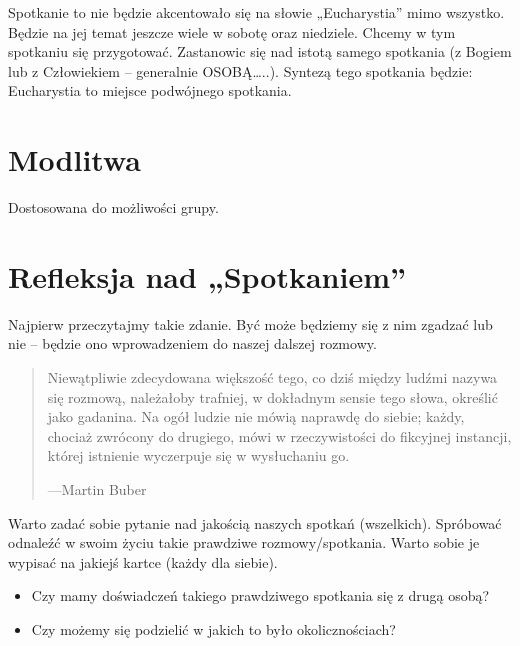 \documentclass[a5paper,10pt,polish]{book}
\begin{document}
Spotkanie to nie będzie akcentowało się na słowie „Eucharystia” mimo wszystko. Będzie na jej temat jeszcze wiele w sobotę oraz niedziele. Chcemy w tym spotkaniu się przygotować. Zastanowic się nad istotą samego spotkania (z Bogiem lub z Człowiekiem – generalnie OSOBĄ…..). Syntezą tego spotkania będzie: Eucharystia to miejsce podwójnego spotkania.


\section{Modlitwa}
\label{babice2006-jesien-knurow/spotkanie1:modlitwa}
Dostosowana do możliwości grupy.


\section{Refleksja nad „Spotkaniem”}
\label{babice2006-jesien-knurow/spotkanie1:refleksja-nad-spotkaniem}
Najpierw przeczytajmy takie zdanie. Być może będziemy się z nim zgadzać lub nie – będzie ono wprowadzeniem do naszej dalszej rozmowy.
\begin{quote}

Niewątpliwie zdecydowana większość tego, co dziś między ludźmi nazywa się rozmową, należałoby trafniej, w dokładnym sensie tego słowa, określić jako gadanina. Na ogół ludzie nie mówią naprawdę do siebie; każdy, chociaż zwrócony do drugiego, mówi w rzeczywistości do fikcyjnej instancji, której istnienie wyczerpuje się w wysłuchaniu go.

\begin{flushright}
---Martin Buber
\end{flushright}
\end{quote}

Warto zadać sobie pytanie nad jakością naszych spotkań (wszelkich). Spróbować odnaleźć w swoim życiu takie prawdziwe rozmowy/spotkania. Warto sobie je wypisać na jakiejś kartce (każdy dla siebie).
\begin{itemize}
\item {} 
Czy mamy doświadczeń takiego prawdziwego spotkania się z drugą osobą?

\item {} 
Czy możemy się podzielić w jakich to było okolicznościach?

\end{itemize}
\end{document}

